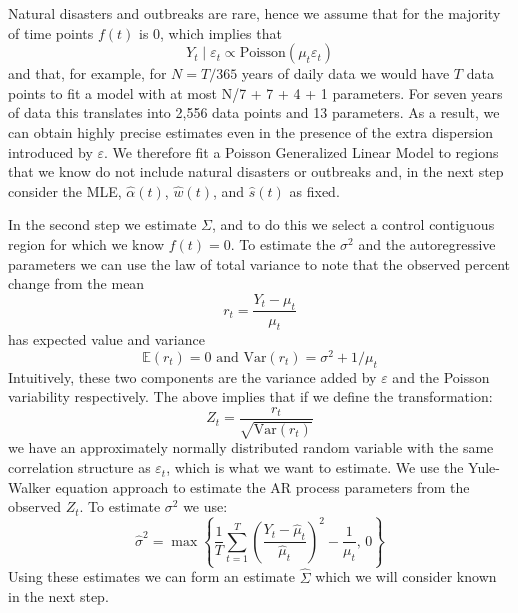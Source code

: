 \documentclass[11pt]{article}
\begin{document}
Natural disasters and outbreaks are rare, hence we assume that for the majority of time points $f(t)$ is 0, which implies that 
\begin{equation*}
    Y_t \mid \varepsilon_t \propto \mbox{Poisson}(\mu_t  \varepsilon_t )
\end{equation*}
and that, for example, for $N = T / 365$ years of daily data we would have $T$ data points to fit a model with at most N/7 + 7 + 4 + 1 parameters. For seven years of data this translates into 2,556 data points and 13 parameters. As a result, we can obtain highly precise estimates even in the presence of the extra dispersion introduced by $\varepsilon$. We therefore fit a Poisson Generalized Linear Model to regions that we know do not include natural disasters or outbreaks and, in the next step consider the MLE, $\hat{\alpha}(t)$, $\hat{w}(t)$, and $\hat{s}(t)$ as fixed.

In the second step we estimate $\Sigma$, and to do this we select a control contiguous region for which we know $f(t)=0$. To estimate the $\sigma^2$ and the autoregressive parameters we can use the law of total variance to note that the observed percent change from the mean
\begin{equation*}
    r_t = \frac{Y_t - \mu_t}{\mu_t}
\end{equation*}
has expected value and variance
\begin{equation*}
    \mathbb{E}\left(r_t \right) = 0 \mbox{ and } \mbox{Var}\left(r_t\right)= \sigma^2 + 1/\mu_t
\end{equation*}
Intuitively, these two components are the variance added by $\varepsilon$ and the Poisson variability respectively. The above implies that if we define the transformation:
\begin{equation*}
    Z_t = \frac{r_t}{\sqrt{\mbox{Var}\left(r_t\right)}}
\end{equation*}
we have an approximately normally distributed random variable with the same correlation structure as $\varepsilon_t$, which is what we want to estimate. We use the Yule-Walker equation approach to estimate the AR process parameters from the observed $Z_t$. To estimate $\sigma^2$ we use:
\begin{equation*}
    \hat{\sigma}^2 = \max\left\{ \frac{1}{T}\sum_{t=1}^T  \left(\frac{Y_t - \hat{\mu}_t}{\hat{\mu}_t}\right)^2  - \frac{1}{\mu_t}, \, 0\right\}
\end{equation*}
Using these estimates we can form an estimate $\hat{\Sigma}$ which we will consider known in the next step.
\end{document}
